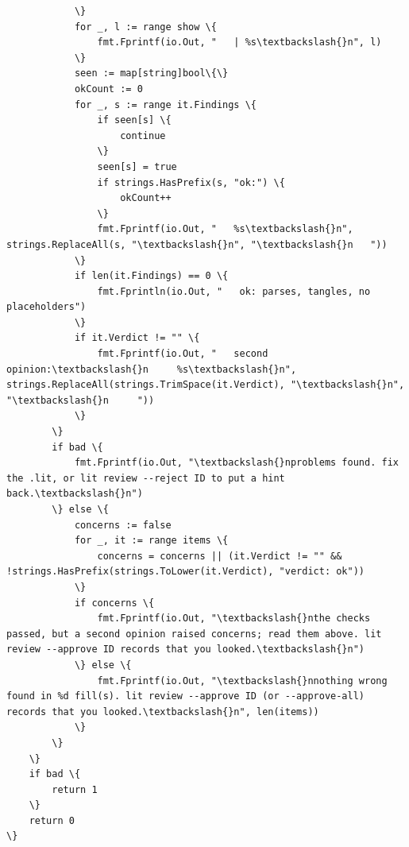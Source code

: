 \documentclass[10pt,a4paper]{article}
\begin{document}
\begin{Verbatim}
			\}
			for _, l := range show \{
				fmt.Fprintf(io.Out, "   | %s\textbackslash{}n", l)
			\}
			seen := map[string]bool\{\}
			okCount := 0
			for _, s := range it.Findings \{
				if seen[s] \{
					continue
				\}
				seen[s] = true
				if strings.HasPrefix(s, "ok:") \{
					okCount++
				\}
				fmt.Fprintf(io.Out, "   %s\textbackslash{}n", strings.ReplaceAll(s, "\textbackslash{}n", "\textbackslash{}n   "))
			\}
			if len(it.Findings) == 0 \{
				fmt.Fprintln(io.Out, "   ok: parses, tangles, no placeholders")
			\}
			if it.Verdict != "" \{
				fmt.Fprintf(io.Out, "   second opinion:\textbackslash{}n     %s\textbackslash{}n", strings.ReplaceAll(strings.TrimSpace(it.Verdict), "\textbackslash{}n", "\textbackslash{}n     "))
			\}
		\}
		if bad \{
			fmt.Fprintf(io.Out, "\textbackslash{}nproblems found. fix the .lit, or lit review --reject ID to put a hint back.\textbackslash{}n")
		\} else \{
			concerns := false
			for _, it := range items \{
				concerns = concerns || (it.Verdict != "" && !strings.HasPrefix(strings.ToLower(it.Verdict), "verdict: ok"))
			\}
			if concerns \{
				fmt.Fprintf(io.Out, "\textbackslash{}nthe checks passed, but a second opinion raised concerns; read them above. lit review --approve ID records that you looked.\textbackslash{}n")
			\} else \{
				fmt.Fprintf(io.Out, "\textbackslash{}nnothing wrong found in %d fill(s). lit review --approve ID (or --approve-all) records that you looked.\textbackslash{}n", len(items))
			\}
		\}
	\}
	if bad \{
		return 1
	\}
	return 0
\}
\end{Verbatim}
\end{document}
